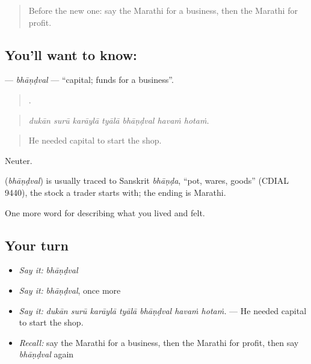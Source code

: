 \label{lesson:MR-C511-bhandval}



\begin{quote}
Before the new one: say the Marathi for a business, then the Marathi for profit.
\end{quote}

\subsection*{You'll want to know: }
\textbf{} — \emph{bhāṇḍval} — \textquotedblleft{}capital; funds for a business\textquotedblright{}.

\begin{quote}
      .
\end{quote}

\begin{quote}
\emph{dukān surū karāylā tyālā bhāṇḍval havaṁ hotaṁ.}
\end{quote}

\begin{quote}
He needed capital to start the shop.
\end{quote}

Neuter.

\begin{cousinweb}
\textbf{} (\emph{bhāṇḍval}) is usually traced to Sanskrit \emph{bhāṇḍa}, \textquotedblleft{}pot, wares, goods\textquotedblright{} (CDIAL 9440), the stock a trader starts with; the ending is Marathi.
\end{cousinweb}

\begin{grammarlens}[title={What you've built}]
One more word for describing what you lived and felt.
\end{grammarlens}

\subsection*{Your turn}
\begin{itemize}
\raggedright
  \item \emph{Say it:} \emph{bhāṇḍval}
  \item \emph{Say it:} \emph{bhāṇḍval}, once more
  \item \emph{Say it:} \emph{dukān surū karāylā tyālā bhāṇḍval havaṁ hotaṁ.} — He needed capital to start the shop.
  \item \emph{Recall:} say the Marathi for a business, then the Marathi for profit, then say \emph{bhāṇḍval} again
\end{itemize}

